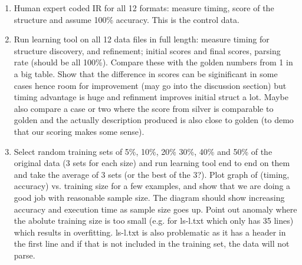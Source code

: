 \begin{enumerate}
\item Human expert coded IR for all 12 formats: measure timing, score of the structure and assume 100\% 
accuracy. This is the control data.

\item Run learning tool on all 12 data files in full length: measure timing for structure discovery, 
and refinement; initial scores and final scores, parsing rate (should be all 100\%).
Compare these with the golden numbers from 1 in a big table. Show that the difference in scores
can be siginificant in some cases hence room for improvement (may go into the discussion section)
but timing advantage is huge and refinment improves initial struct a lot. Maybe also compare a case or
two where the score from silver is comparable to golden and the actually description produced is also
close to golden (to demo that our scoring makes some sense).

\item Select random training sets of 5\%, 10\%, 20\% 30\%, 40\% and 50\% of the original data (3 sets for
each size) and run learning tool end to end on them and take the average of 3 sets (or the best of the 3?). 
Plot graph of (timing, accuracy) vs. training size 
for a few examples, and show that we are doing a good job with reasonable sample size. The diagram should
show increasing accuracy and execution time as sample size goes up. Point out anomaly
where the abolute training size is too small (e.g. for ls-l.txt which only has 35 lines) which results
in overfitting. ls-l.txt is also problematic as it has a header in the first line and if that is not included
in the training set, the data will not parse.
\end{enumerate}
